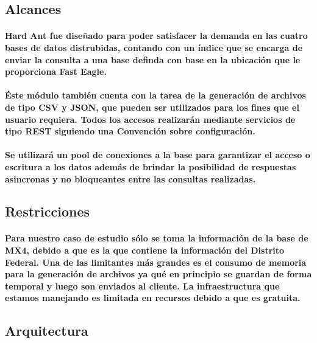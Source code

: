   \subsection{Alcances}
    \paragraph{Hard Ant fue diseñado para poder satisfacer la demanda en las cuatro bases de datos distrubidas, contando con un índice que se encarga de enviar la consulta a una base definda con base en la ubicación que le proporciona Fast Eagle.}
    \paragraph{Éste módulo también cuenta con la tarea de la generación de archivos de tipo CSV y JSON, que pueden ser utilizados para los fines que el usuario requiera. Todos los accesos realizarán mediante servicios de tipo REST siguiendo una Convención sobre configuración.} 
    \paragraph{Se utilizará un pool de conexiones a la base para garantizar el acceso o escritura a los datos además de brindar la posibilidad de respuestas asincronas y no bloqueantes entre las consultas realizadas.}
  \subsection{Restricciones}
    \paragraph{Para nuestro caso de estudio sólo se toma la información de la base de MX4, debido a que es la que contiene la información del Distrito Federal. Una de las limitantes más grandes es el consumo de memoria para la generación de archivos ya qué en principio se guardan de forma temporal y luego son enviados al cliente. La infraestructura que estamos manejando es limitada en recursos debido a que es gratuita.}
  \subsection{Arquitectura}
